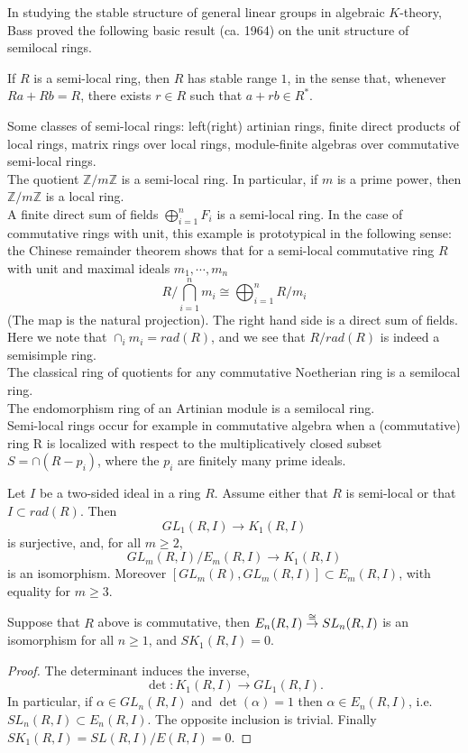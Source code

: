 In studying the stable structure of general linear groups in algebraic $K$-theory, Bass proved the following basic result (ca. 1964) on  the  unit
structure  of semilocal rings.
\begin{theorem}
	 If $R$ is a semi-local ring, then $R$ has stable range $1$,
in the sense that, whenever $Ra + Rb = R$, there exists $r \in R$ such that
$a + rb \in R^*$.
\end{theorem}
\begin{example}
Some classes of semi-local rings: left(right) artinian rings, finite direct products of local rings, matrix rings over local rings, module-finite algebras over commutative semi-local rings.\\
The quotient $\mathbb{Z}/m\mathbb{Z}$ is a semi-local ring. In particular, if $m$ is a prime power, then $\mathbb{Z}/m\mathbb{Z}$ is a local ring.\\
A finite direct sum of fields $\bigoplus_{i=1}^n{F_i}$ is a semi-local ring.
In the case of commutative rings with unit, this example is prototypical in the following sense: the Chinese remainder theorem shows that for a semi-local commutative ring $R$ with unit and maximal ideals $m_1, \cdots, m_n$
\[R/\bigcap_{i=1}^n m_i\cong\bigoplus_{i=1}^n R/m_i\]
(The map is the natural projection). The right hand side is a direct sum of fields. Here we note that $\cap_i m_i=rad(R)$, and we see that $R/rad(R)$ is indeed a semisimple ring.\\
The classical ring of quotients for any commutative Noetherian ring is a semilocal ring.\\
The endomorphism ring of an Artinian module is a semilocal ring.\\
Semi-local rings occur for example in commutative algebra when a (commutative) ring R is localized with respect to the multiplicatively closed subset $S = \cap (R - p_i)$, where the $p_i$ are finitely many prime ideals.
\end{example}

\begin{theorem}
	Let $I$ be a two-sided ideal in a ring $R$. Assume either that $R$ is semi-local or that $I\subset rad(R)$. Then 
	\[GL_1(R,I)\longrightarrow K_1(R,I)\]
	is surjective, and, for all $m\geq 2$,
	\[GL_m(R,I)/E_m(R,I)\longrightarrow K_1(R,I)\]
	is an isomorphism. Moreover $[GL_m(R),GL_m(R,I)]\subset E_m(R,I)$, with equality for $m\geq 3$.
\end{theorem}
\begin{corollary}
	Suppose that $R$ above is commutative, then $E_n(R,I)\overset{\cong}{\to} SL_n(R,I)$ is an isomorphism for all $n\geq 1$, and $SK_1(R,I)=0$.
\end{corollary}
\begin{proof}
	The determinant induces the inverse, 
	\[\det \colon K_1(R,I)\longrightarrow GL_1(R,I).\]
	In particular, if $\alpha\in GL_n(R,I)$ and $\det(\alpha)=1$ then $\alpha \in E_n(R,I)$, i.e.\ $SL_n(R,I)\subset E_n(R,I)$. The opposite inclusion is trivial. Finally $SK_1(R,I)=SL(R,I)/E(R,I)=0$.
\end{proof}


